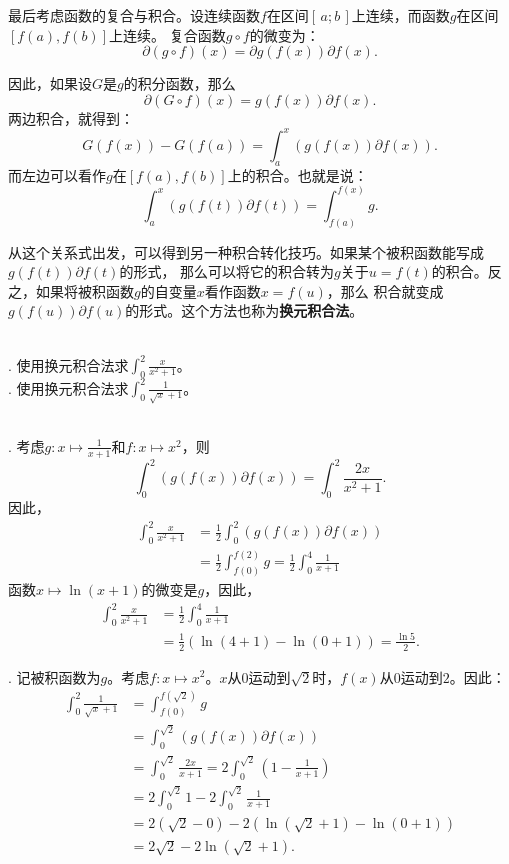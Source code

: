 \documentclass[12pt,UTF8,fontset=none]{ctexbook}
\begin{document}
最后考虑函数的复合与积合。设连续函数$f$在区间$[\,a; b\,]$上连续，而函数$g$在区间$[f(a), f(b)]$上连续。
复合函数$g\circ f$的微变为：
$$ \partial (g \circ f) (x) = \partial g(f(x)) \partial f (x). $$

因此，如果设$G$是$g$的积分函数，那么
$$ \partial (G \circ f) (x) = g(f(x)) \partial f (x). $$
两边积合，就得到：
$$ G(f(x)) - G(f(a)) = \int_a^x \left( g(f(x)) \partial f (x) \right).$$
而左边可以看作$g$在$[f(a), f(b)]$上的积合。也就是说：
$$ \int_a^x \left( g(f(t)) \partial f (t) \right) = \int_{f(a)}^{f(x)} g.$$

从这个关系式出发，可以得到另一种积合转化技巧。如果某个被积函数能写成$g(f(t)) \partial f (t)$的形式，
那么可以将它的积合转为$g$关于$u = f(t)$的积合。反之，如果将被积函数$g$的自变量$x$看作函数$x = f(u)$，那么
积合就变成$g(f(u)) \partial f (u)$的形式。这个方法也称为\textbf{换元积合法}。

\begin{et}
    \mbox{} \\
    . 使用换元积合法求$\int_0^2 \frac{x}{x^2 + 1}$。 \\
    . 使用换元积合法求$\int_0^2 \frac{1}{\sqrt{x} + 1}$。
\end{et}

\begin{so}
    \mbox{} \\
    . 考虑$g: x\mapsto \frac{1}{x + 1}$和$f: x\mapsto x^2$，则
    $$ \int_0^2 \left( g(f(x)) \partial f (x) \right) = \int_0^2 \frac{2x}{x^2 + 1}. $$
    因此，
    \begin{align*}
        \int_0^2 \frac{x}{x^2 + 1} &= \frac{1}{2} \int_0^2 \left( g(f(x)) \partial f (x) \right) \\
        &= \frac{1}{2}\int_{f(0)}^{f(2)} g = \frac{1}{2}\int_0^4 \frac{1}{x + 1} 
    \end{align*}
    函数$x\mapsto \ln{(x + 1)}$的微变是$g$，因此，
    \begin{align*}
        \int_0^2 \frac{x}{x^2 + 1} &= \frac{1}{2}\int_0^4 \frac{1}{x + 1} \\
        &= \frac{1}{2}\left(\ln{(4 + 1)} - \ln{(0 + 1)}\right) = \frac{\ln{5}}{2}.
    \end{align*}

    . 记被积函数为$g$。考虑$f: x\mapsto x^2$。$x$从$0$运动到$\sqrt{2}$时，$f(x)$从$0$运动到$2$。因此：
    \begin{align*}
        \int_0^2 \frac{1}{\sqrt{x} + 1} &= \int_{f(0)}^{f(\sqrt{2})} g \\
        &= \int_0^{\sqrt{2}} \left( g(f(x)) \partial f (x) \right) \\
        &= \int_0^{\sqrt{2}} \frac{2x}{x + 1} = 2\int_0^{\sqrt{2}} \left( 1 - \frac{1}{x + 1} \right) \\
        &= 2\int_0^{\sqrt{2}} 1 - 2\int_0^{\sqrt{2}} \frac{1}{x + 1} \\
        &= 2(\sqrt{2} - 0) - 2 \left(\ln{(\sqrt{2} + 1)} - \ln{(0 + 1)}\right) \\
        &= 2\sqrt{2} - 2\ln{(\sqrt{2} + 1)}.
    \end{align*}
\end{so}
\end{document}
